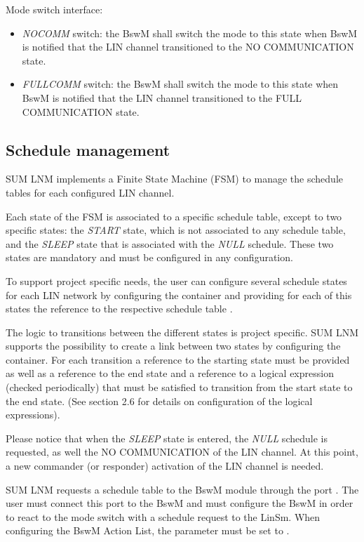 Mode switch interface:
\begin{itemize}
\item \textit{NOCOMM} switch: the BswM shall switch the mode to this state when BswM is notified that the LIN channel transitioned to the NO COMMUNICATION state.
\item \textit{FULLCOMM} switch: the BswM shall switch the mode to this state when BswM is notified that the LIN channel transitioned to the FULL COMMUNICATION state.
\end{itemize}

\subsection{Schedule management}
\label{subsec:SchMgnt}
SUM LNM implements a Finite State Machine (FSM) to manage the schedule tables for each configured LIN channel.


Each state of the FSM is associated to a specific schedule table, except to two specific states: the \textit{START} state, which is not associated to any schedule table, and the \textit{SLEEP} state that is associated with the \textit{NULL} schedule. These two states are mandatory and must be configured in any configuration.


To support project specific needs, the user can configure several schedule states for each LIN network by configuring the container  and providing for each of this states the reference to the respective schedule table .


The logic to transitions between the different states is project specific. SUM LNM supports the possibility to create a link between two states by configuring the  container. For each transition a reference to the starting state must be provided  as well as a reference to the end state  and a reference to a logical expression (checked periodically) that must be satisfied to transition from the start state to the end state. (See section 2.6 for details on configuration of the logical expressions).


Please notice that when the \textit{SLEEP} state is entered, the \textit{NULL} schedule is requested, as well the {NO COMMUNICATION} of the LIN channel. At this point, a new commander (or responder) activation of the LIN channel is needed.


SUM LNM requests a schedule table to the BswM module through \newline the port . The user must connect this port to the BswM and must configure the BswM in order to react to the mode switch with a schedule request to the LinSm.
When configuring the BswM Action List, the parameter  must be set to .

